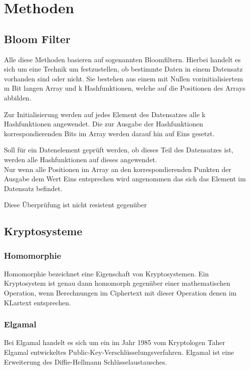 \chapter{Methoden}
\label{sec:Chapter2}
\section{Bloom Filter}
\label{sec:Sec1.2}

Alle diese Methoden basieren auf sogenannten Bloomfiltern.
Hierbei handelt es sich um eine  Technik um festzustellen, ob bestimmte Daten in einem Datensatz vorhanden sind oder nicht.
Sie bestehen aus einem mit Nullen vorinitialisiertem m Bit langen Array und k Hashfunktionen, welche auf die Positionen des Arrays abbilden.

Zur Initialisierung werden auf jedes Element des Datensatzes alle k Hashfunktionen angewendet.
Die zur Ausgabe der Hashfunktionen korrespondierenden Bits im Array werden darauf hin auf Eins gesetzt.

Soll für ein Datenelement geprüft werden, ob dieses Teil des Datensatzes ist, werden  alle Hashfunktionen auf dieses angewendet.\\
Nur wenn alle Positionen im Array an den korrespondierenden Punkten der Ausgabe dem Wert Eins entsprechen wird angenommen das sich das Element im Datensatz befindet.

Diese Überprüfung ist nicht resistent gegenüber  

\section{Kryptosysteme}
\label{sec:Sec1.3}

\subsection{Homomorphie}
Homomorphie bezeichnet eine Eigenschaft von Kryptosystemen. 
Ein Kryptosystem ist genau dann homomorph gegenüber einer mathematischen Operation, wenn Berechnungen im Ciphertext mit dieser Operation denen im KLartext entsprechen.

\subsection{Elgamal}
\label{sec:Sec1.3.1}
Bei Elgamal handelt es sich um ein im Jahr 1985 vom Kryptologen Taher Elgamal entwickeltes Public-Key-Verschlüsselungsverfahren. Elgamal ist eine Erweiterung des Diffie-Hellmann Schlüsselaustausches.

